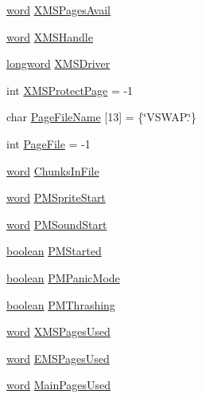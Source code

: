 \begin{DoxyCompactItemize}
\item 
\hyperlink{ID__HEAD_8H_abad51e07ab6d26bec9f1f786c8d65bcd}{word} \hyperlink{ID__PM_8C_ac00fcb63e290e188116ecc3f43ec3f93}{XMSPagesAvail}
\item 
\hyperlink{ID__HEAD_8H_abad51e07ab6d26bec9f1f786c8d65bcd}{word} \hyperlink{ID__PM_8C_a091a2f0e24a80ebc24869f64bcf99182}{XMSHandle}
\item 
\hyperlink{ID__HEAD_8H_a8a9a7dd50c6fdb45dcdf0eb929479663}{longword} \hyperlink{ID__PM_8C_aefba3ee02ef1b767db68787510867859}{XMSDriver}
\item 
int \hyperlink{ID__PM_8C_a591ec8badf330c29bff6aed5cf4d0b2f}{XMSProtectPage} = -\/1
\item 
char \hyperlink{ID__PM_8C_a3d2a1c78f3a8c484f8b2ed0cbe566453}{PageFileName} \mbox{[}13\mbox{]} = \{\char`\"{}VSWAP.\char`\"{}\}
\item 
int \hyperlink{ID__PM_8C_a546fb248e72f20f38e68c4a913206f25}{PageFile} = -\/1
\item 
\hyperlink{ID__HEAD_8H_abad51e07ab6d26bec9f1f786c8d65bcd}{word} \hyperlink{ID__PM_8C_af385634b054d3e3d81d85865b3d7e71e}{ChunksInFile}
\item 
\hyperlink{ID__HEAD_8H_abad51e07ab6d26bec9f1f786c8d65bcd}{word} \hyperlink{ID__PM_8C_ac15156742487c3e546be66ffc29b4473}{PMSpriteStart}
\item 
\hyperlink{ID__HEAD_8H_abad51e07ab6d26bec9f1f786c8d65bcd}{word} \hyperlink{ID__PM_8C_a4274c51cf3dd5e7fd0c4562376e91d3b}{PMSoundStart}
\item 
\hyperlink{ID__HEAD_8H_a7c6368b321bd9acd0149b030bb8275ed}{boolean} \hyperlink{ID__PM_8C_a3bdbaa7efb77df38888d8e0dd19a0bf2}{PMStarted}
\item 
\hyperlink{ID__HEAD_8H_a7c6368b321bd9acd0149b030bb8275ed}{boolean} \hyperlink{ID__PM_8C_af388af9d50f174974a23868c2284f59e}{PMPanicMode}
\item 
\hyperlink{ID__HEAD_8H_a7c6368b321bd9acd0149b030bb8275ed}{boolean} \hyperlink{ID__PM_8C_a884dd0e6012652c6ecbd41f8b069fe4b}{PMThrashing}
\item 
\hyperlink{ID__HEAD_8H_abad51e07ab6d26bec9f1f786c8d65bcd}{word} \hyperlink{ID__PM_8C_a237331007a52aca910a5f97d3be50266}{XMSPagesUsed}
\item 
\hyperlink{ID__HEAD_8H_abad51e07ab6d26bec9f1f786c8d65bcd}{word} \hyperlink{ID__PM_8C_ab8637fe892c50d2bc1a0766d23ec3759}{EMSPagesUsed}
\item 
\hyperlink{ID__HEAD_8H_abad51e07ab6d26bec9f1f786c8d65bcd}{word} \hyperlink{ID__PM_8C_a29f989d2023364e9b053ae3406d714e0}{MainPagesUsed}

\end{DoxyCompactItemize}
